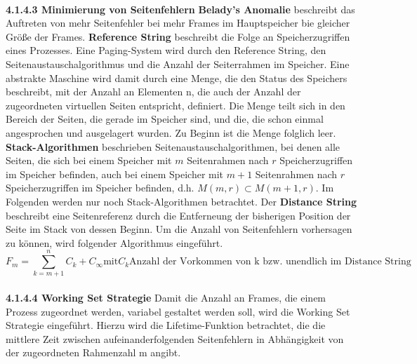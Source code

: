 \documentclass{article}
\begin{document}
    \\
    \textbf{4.1.4.3 Minimierung von Seitenfehlern}\newline
    \textbf{Belady's Anomalie} beschreibt das Auftreten von mehr Seitenfehler bei mehr Frames im Hauptspeicher bie gleicher Größe der Frames.\newline
    \textbf{Reference String} beschreibt die Folge an Speicherzugriffen eines Prozesses.\newline
    Eine Paging-System wird durch den Reference String, den Seitenaustauschalgorithmus und die Anzahl der Seiterrahmen im Speicher.\newline
    Eine abstrakte Maschine wird damit durch eine Menge, die den Status des Speichers beschreibt, mit der Anzahl an Elementen n, die auch der Anzahl der zugeordneten virtuellen Seiten entspricht, definiert. Die Menge teilt sich in den Bereich der Seiten, die gerade im Speicher sind, und die, die schon einmal angesprochen und ausgelagert wurden. Zu Beginn ist die Menge folglich leer.\newline
    \textbf{Stack-Algorithmen} beschrieben Seitenaustauschalgorithmen, bei denen alle Seiten, die sich bei einem Speicher mit $m$ Seitenrahmen nach $r$ Speicherzugriffen im Speicher befinden, auch bei einem Speicher mit $m+1$ Seitenrahmen nach $r$ Speicherzugriffen im Speicher befinden, d.h. $M(m,r)\subset M(m+1,r)$.\newline
    Im Folgenden werden nur noch Stack-Algorithmen betrachtet.\newline
    Der \textbf{Distance String} beschreibt eine Seitenreferenz durch die Entferneung der bisherigen Position der Seite im Stack von dessen Beginn.\newline
    Um die Anzahl von Seitenfehlern vorhersagen zu können, wird folgender Algorithmus eingeführt.
    \begin{equation}
        F_m = \sum_{k=m+1}^n C_k + C_{\infty} \text{mit} C_k \text{Anzahl der Vorkommen von k bzw. unendlich im Distance String}
    \end{equation}\newline
    \\
    \textbf{4.1.4.4 Working Set Strategie}\newline
    Damit die Anzahl an Frames, die einem Prozess zugeordnet werden, variabel gestaltet werden soll, wird die Working Set Strategie eingeführt. Hierzu wird die Lifetime-Funktion betrachtet, die die mittlere Zeit zwischen aufeinanderfolgenden Seitenfehlern in Abhängigkeit von der zugeordneten Rahmenzahl m angibt.
\end{document}
